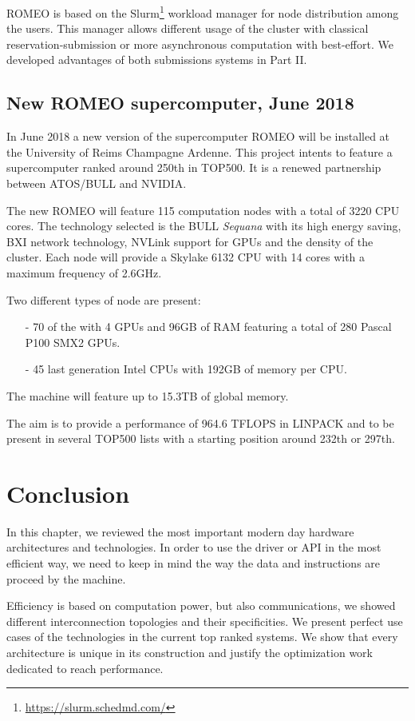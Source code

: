 ROMEO is based on the Slurm\footnote{\url{https://slurm.schedmd.com/}} workload manager for node distribution among the users. 
This manager allows different usage of the cluster with classical reservation-submission or more asynchronous computation with best-effort. 
We developed advantages of both submissions systems in Part II. 

\subsection{New ROMEO supercomputer, June 2018}

In June 2018 a new version of the supercomputer ROMEO will be installed at the University of Reims Champagne Ardenne. 
This project intents to feature a supercomputer ranked around 250th in TOP500. 
It is a renewed partnership between ATOS/BULL and NVIDIA. 

The new ROMEO will feature 115 computation nodes with a total of 3220 CPU cores. 
The technology selected is the BULL \textit{Sequana} with its high energy saving, BXI network technology, NVLink support for GPUs and the density of the cluster. 
Each node will provide a Skylake 6132 CPU with 14 cores with a maximum frequency of 2.6GHz.

Two different types of node are present: 
\begin{itemize}[noitemsep,nolistsep]
\item[-] 70 of the with 4 GPUs and 96GB of RAM featuring a total of 280 Pascal P100 SMX2 GPUs.
\item[-] 45 last generation Intel CPUs with 192GB of memory per CPU. 
\end{itemize}

The machine will feature up to 15.3TB of global memory. 

The aim is to provide a performance of 964.6 TFLOPS in LINPACK and to be present in several TOP500 lists with a starting position around 232th or 297th. 

\section{Conclusion}

In this chapter, we reviewed the most important modern day hardware architectures and technologies. 
In order to use the driver or API in the most efficient way, we need to keep in mind the way the data and instructions are proceed by the machine. 

Efficiency is based on computation power, but also communications, we showed different interconnection topologies and their specificities. 
We present perfect use cases of the technologies in the current top ranked systems.
We show that every architecture is unique in its construction and justify the optimization work dedicated to reach performance. 


